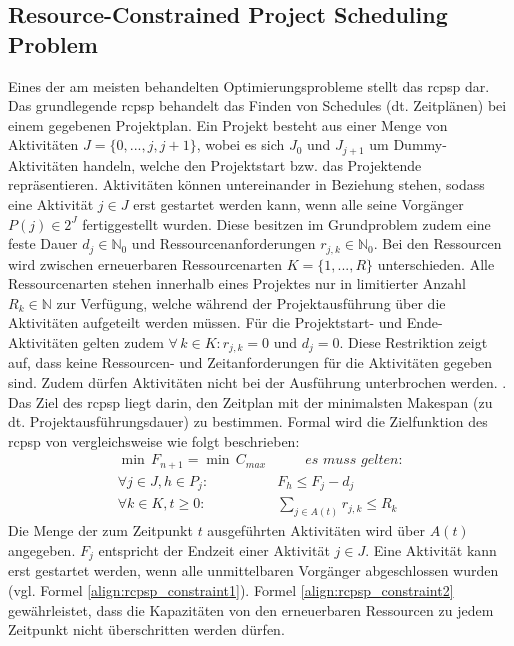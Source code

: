 \subsection{Resource-Constrained Project Scheduling Problem} \label{subsec:MRCPSP_RCPSP}


Eines der am meisten behandelten Optimierungsprobleme stellt das \ac{rcpsp} dar. Das grundlegende \ac{rcpsp} behandelt das Finden von Schedules (dt. Zeitplänen) bei einem gegebenen Projektplan. Ein Projekt besteht aus einer Menge von Aktivitäten $J = \{ 0, ..., j, j + 1 \}$, wobei es sich $J_0$ und $J_{j+1}$ um Dummy-Aktivitäten handeln, welche den Projektstart bzw. das Projektende repräsentieren. Aktivitäten können untereinander in Beziehung stehen, sodass eine Aktivität $j \in J$ erst gestartet werden kann, wenn alle seine Vorgänger $P(j) \in 2^J$ fertiggestellt wurden. Diese besitzen im Grundproblem zudem eine feste Dauer $d_j \in \mathbb{N}_0$ und Ressourcenanforderungen $r_{j,k} \in \mathbb{N}_0$. Bei den Ressourcen wird zwischen erneuerbaren Ressourcenarten $K = \{1, ..., R\}$ unterschieden. Alle Ressourcenarten stehen innerhalb eines Projektes nur in limitierter Anzahl $R_{k} \in \mathbb{N}$ zur Verfügung, welche während der Projektausführung über die Aktivitäten aufgeteilt werden müssen. Für die Projektstart- und Ende-Aktivitäten gelten zudem $\forall \, k \in K: r_{j,k} = 0$ und $d_j = 0$. Diese Restriktion zeigt auf, dass keine Ressourcen- und Zeitanforderungen für die Aktivitäten gegeben sind. Zudem dürfen Aktivitäten nicht bei der Ausführung unterbrochen werden. \cite[vgl.][S. 1 ff.]{kolisch_heuristic_1998}. \\

Das Ziel des \ac{rcpsp} liegt darin, den Zeitplan mit der minimalsten Makespan (zu dt. Projektausführungsdauer) zu bestimmen. Formal wird die Zielfunktion des \ac{rcpsp} von \cite[S. 1]{kolisch_heuristic_1998} vergleichsweise wie folgt beschrieben:
\begin{align}
    \min \, F_{n+1} = \min \, C_{max} & \qquad \textit{es muss gelten:} \label{align:rcpsp_goal} \\
    \forall j \in J, h \in P_j:\, & F_h \leq F_j - d_j \label{align:rcpsp_constraint1} \\
    \forall k \in K, t \geq 0:\, & \sum_{j \in A(t)} r_{j,k} \leq R_k  \label{align:rcpsp_constraint2}
\end{align}
Die Menge der zum Zeitpunkt $t$ ausgeführten Aktivitäten wird über $A(t)$ angegeben. $F_j$ entspricht der Endzeit einer Aktivität $j \in J$. Eine Aktivität kann erst gestartet werden, wenn alle unmittelbaren Vorgänger abgeschlossen wurden (vgl. Formel \ref{align:rcpsp_constraint1}). Formel \ref{align:rcpsp_constraint2} gewährleistet, dass die Kapazitäten von den erneuerbaren Ressourcen zu jedem Zeitpunkt nicht überschritten werden dürfen. 

